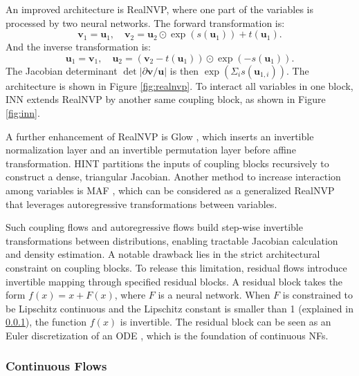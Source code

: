 An improved architecture is \ac{RealNVP}, where one part of the variables is processed by two neural networks. The forward transformation is:
\begin{equation}
    \boldsymbol{v}_1 = \boldsymbol{u}_1, \quad \boldsymbol{v}_2 = \boldsymbol{u}_2\odot\exp(s(\boldsymbol{u}_1))+t(\boldsymbol{u}_1).
\end{equation}
And the inverse transformation is:
\begin{equation}
    \boldsymbol{u}_1 = \boldsymbol{v}_1, \quad \boldsymbol{u}_2 = (\boldsymbol{v}_2-t(\boldsymbol{u}_1))\odot\exp(-s(\boldsymbol{u}_1)).
\end{equation}
The Jacobian determinant $\det|\partial\boldsymbol{v}/\boldsymbol{u}|$ is then $\exp(\Sigma_i s(\boldsymbol{u}_{1,i}))$.
The architecture is shown in Figure \ref{fig:realnvp}. To interact all variables in one block, \ac{INN} \citep{ardizzone2019inn} extends \ac{RealNVP} by another same coupling block, as shown in Figure \ref{fig:inn}. 

A further enhancement of \ac{RealNVP} is Glow \citep{kingma2018glow}, which inserts an invertible normalization layer and an invertible permutation layer before affine transformation. \ac{HINT} \citep{kruse2021hint} partitions the inputs of coupling blocks recursively to construct a dense, triangular Jacobian. Another method to increase interaction among variables is \ac{MAF} \citep{papamakarios2018maf}, which can be considered as a generalized \ac{RealNVP} that leverages autoregressive transformations between variables.

Such coupling flows and autoregressive flows build step-wise invertible transformations between distributions, enabling tractable Jacobian calculation and density estimation. A notable drawback lies in the strict architectural constraint on coupling blocks. To release this limitation, residual flows \citep{behrmann2019ires, chen2020resflow} introduce invertible mapping through specified residual blocks. A residual block \citep{he2015residual} takes the form $f(x)=x+F(x)$, where $F$ is a neural network. When $F$ is constrained to be Lipschitz continuous and the Lipschitz constant is smaller than 1 (explained in \ref{sec:cnf}), the function $f(x)$ is invertible. The residual block can be seen as an Euler discretization of an \ac{ODE} \citep{lu2020finitelayer, ruthotto2018deep, haber2017stable}, which is the foundation of continuous \acp{NF}. 

\subsubsection{Continuous Flows}
\label{sec:cnf}
